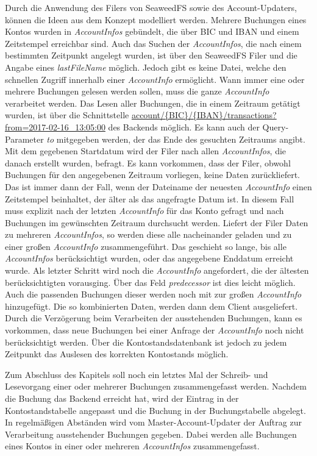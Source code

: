\documentclass[12pt,oneside,a4paper,parskip]{scrbook}
\begin{document}
Durch die Anwendung des Filers von SeaweedFS sowie des Account-Updaters, können die Ideen aus dem Konzept modelliert werden.
Mehrere Buchungen eines Kontos wurden in \textit{AccountInfos} gebündelt, die über BIC und IBAN und einem Zeitstempel erreichbar sind. Auch das Suchen der \textit{AccountInfos}, die nach einem bestimmten Zeitpunkt angelegt wurden, ist über den SeaweedFS Filer und die Angabe eines \textit{lastFileName} möglich. Jedoch gibt es keine Datei, welche den schnellen Zugriff innerhalb einer \textit{AccountInfo} ermöglicht. Wann immer eine oder mehrere Buchungen gelesen werden sollen, muss die ganze \textit{AccountInfo} verarbeitet werden. Das Lesen aller Buchungen, die in einem Zeitraum getätigt wurden, ist über die Schnittstelle \url{account/{BIC}/{IBAN}/transactions?from=2017-02-16_13:05:00} des Backends möglich. Es kann auch der Query-Parameter \textit{to} mitgegeben werden, der das Ende des gesuchten Zeitraums angibt. Mit dem gegebenen Startdatum wird der Filer nach allen \textit{AccountInfos}, die danach erstellt wurden, befragt. Es kann vorkommen, dass der Filer, obwohl Buchungen für den angegebenen Zeitraum vorliegen, keine Daten zurückliefert. Das ist immer dann der Fall, wenn der Dateiname der neuesten \textit{AccountInfo} einen Zeitstempel beinhaltet, der älter als das angefragte Datum ist. In diesem Fall muss explizit nach der letzten \textit{AccountInfo} für das Konto gefragt und nach Buchungen im gewünschten Zeitraum durchsucht werden. Liefert der Filer Daten zu mehreren \textit{AccountInfos}, so werden diese alle nacheinander geladen und zu einer großen \textit{AccountInfo} zusammengeführt. Das geschieht so lange, bis alle \textit{AccountInfos} berücksichtigt wurden, oder das angegebene Enddatum erreicht wurde. Als letzter Schritt wird noch die \textit{AccountInfo} angefordert, die der ältesten berücksichtigten vorausging. Über das Feld \textit{predecessor} ist dies leicht möglich. Auch die passenden Buchungen dieser werden noch mit zur großen \textit{AccountInfo} hinzugefügt. Die so kombinierten Daten, werden dann dem Client ausgeliefert. 
Durch die Verzögerung beim Verarbeiten der ausstehenden Buchungen, kann es vorkommen, dass neue Buchungen bei einer Anfrage der \textit{AccountInfo} noch nicht berücksichtigt werden. Über die Kontostandsdatenbank ist jedoch zu jedem Zeitpunkt das Auslesen des korrekten Kontostands möglich.

Zum Abschluss des Kapitels soll noch ein letztes Mal der Schreib- und Lesevorgang einer oder mehrerer Buchungen zusammengefasst werden. Nachdem die Buchung das Backend erreicht hat, wird der Eintrag in der Kontostandstabelle angepasst und die Buchung in der Buchungstabelle abgelegt. In regelmäßigen Abständen wird vom Master-Account-Updater der Auftrag zur Verarbeitung ausstehender Buchungen gegeben. Dabei werden alle Buchungen eines Kontos in einer oder mehreren \textit{AccountInfos} zusammengefasst.
\end{document}
